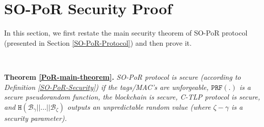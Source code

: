 

\section{SO-PoR Security Proof}\label{SO-PoR-Security-Proof}
In this section, we first restate the main security theorem of SO-PoR protocol (presented in Section \ref{SO-PoR-Protocol}) and then prove it.  


\


\noindent\textbf{Theorem \ref{PoR-main-theorem}.} \textit{SO-PoR protocol is secure (according to Definition \ref{SO-PoR-Security}) if the tags/MAC's are unforgeable, $\mathtt{PRF}(.)$ is a secure pseudorandom function, the blockchain is secure, C-TLP protocol is secure, and $\mathtt{H}( \mathcal {B}_{\scriptscriptstyle \gamma}||...||  \mathcal {B}_{\scriptscriptstyle \zeta})$ outputs an unpredictable random value (where $\zeta-\gamma$ is a security parameter).}


